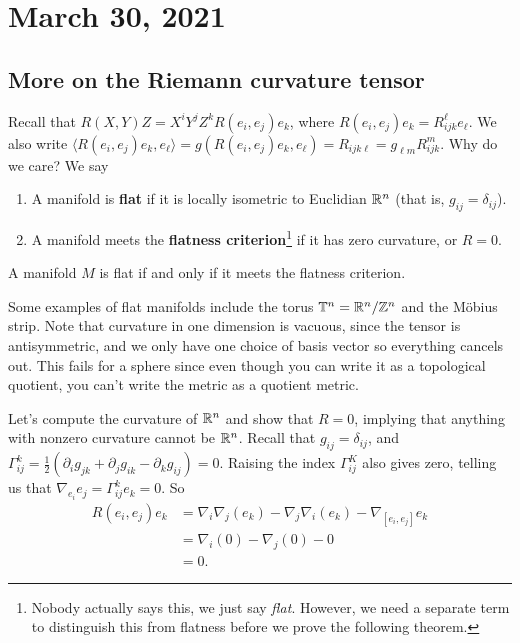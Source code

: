 \section{March 30, 2021} 

\subsection{More on the Riemann curvature tensor}
Recall that $R(X,Y)Z=X^i Y^j Z^k R(e_i ,e_j )e_k$, where $R(e_i ,e_j )e_k=R_{ijk}^{\ell}e_{\ell}$. We also write $\langle R(e_i ,e_j )e_k,e_{\ell} \rangle =g(R(e_i ,e_j )e_k,e_{\ell})=R_{ijk\ell}=g_{\ell m}R_{ijk}^m$.
Why do we care? We say 
\begin{enumerate}[label=(\arabic*)]
\setlength\itemsep{-.2em}
    \item A manifold is \textbf{flat} if it is locally isometric to Euclidian $\mathbb{R}^n $ (that is, $g_{ij}=\delta _{ij}  $).
    \item A manifold meets the \textbf{flatness criterion}\footnote{Nobody actually says this, we just say \emph{flat}. However, we need a separate term to distinguish this from flatness before we prove the following theorem.} if it has zero curvature, or $R=0$.
\end{enumerate}
\begin{theorem}\label{flatness} 
    A manifold $M$ is flat if and only if it meets the flatness criterion.
\end{theorem}
\begin{example}
    Some examples of flat manifolds include the torus $\mathbb{T}^n =\mathbb{R}^n /\mathbb{Z}^n $ and the M\"obius strip. Note that curvature in one dimension is vacuous, since the tensor is antisymmetric, and we only have one choice of basis vector so everything cancels out. This fails for a sphere since even though you can write it as a topological quotient, you can't write the metric as a quotient metric.
\end{example}
\begin{example}
    Let's compute the curvature of $\mathbb{R}^n $ and show that $R=0$, implying that anything with nonzero curvature cannot be $\mathbb{R}^n $. Recall that $g_{ij}=\delta _{ij}$, and $\Gamma _{ij}^k=\frac{1}{2}(\partial _i g_{jk}+\partial _jg_{ik}-\partial _kg_{ij})=0$. Raising the index $\Gamma _{ij}^K$ also gives zero, telling us that $\nabla_{e_i }e_j =\Gamma _{ij}^ke_k=0.$ So 
    \begin{align*}
        R(e_i ,e_j )e_k&=\nabla_i \nabla_j (e_k)-\nabla_j \nabla_i (e_k)-\nabla_{[e_i ,e_j ]}e_k\\
    &=\nabla_i (0)-\nabla_j (0)-0\\
    &=0.
    \end{align*}
\end{example}
